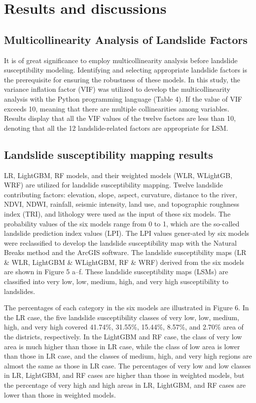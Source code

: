 \documentclass[a4paper,fleqn]{cas-sc}
\begin{document}
\section{Results and discussions}
\subsection{Multicollinearity Analysis of Landslide Factors}

It is of great significance to employ multicollinearity analysis before landslide susceptibility modeling. 
Identifying and selecting appropriate landslide factors is the prerequisite for ensuring the robustness of these models. 
In this study, the variance inflation factor (VIF) was utilized to develop the multicollinearity analysis with the Python programming language (Table 4). 
If the value of VIF exceeds 10, meaning that there are multiple collinearities among variables. 
Results display that all the VIF values of the twelve factors are less than 10, denoting that all the 12 landslide-related factors are appropriate for LSM.

\subsection{Landslide susceptibility mapping results}

LR, LightGBM, RF models, and their weighted models (WLR, WLightGB, WRF) are utilized for landslide susceptibility mapping. 
Twelve landslide contributing factors: elevation, slope, aspect, curvature, distance to the river, NDVI, NDWI, rainfall, seismic intensity, land use, and topographic roughness index (TRI), and lithology were used as the input of these six models. 
The probability values of the six models range from 0 to 1, which are the so-called landslide prediction index values (LPI). 
The LPI values gener-ated by six models were reclassified to develop the landslide susceptibility map with the Natural Breaks method and the ArcGIS software. 
The landslide susceptibility maps (LR \& WLR, LightGBM \& WLightGBM, RF \& WRF) derived from the six models are shown in Figure 5 a–f. 
These landslide susceptibility maps (LSMs) are classified into very low, low, medium, high, and very high susceptibility to landslides. 

The percentages of each category in the six models are illustrated in Figure 6. 
In the LR case, the five landslide susceptibility classes of very low, low, medium, high, and very high covered 41.74\%, 31.55\%, 15.44\%, 8.57\%, and 2.70\% area of the districts, respectively. 
In the LightGBM and RF case, the class of very low area is much higher than those in LR case, while the class of low area is lower than those in LR case, and the classes of medium, high, and very high regions are almost the same as those in LR case. 
The percentages of very low and low classes in LR, LightGBM, and RF cases are higher than those in weighted models, but the percentage of very high and high areas in LR, LightGBM, and RF cases are lower than those in weighted models.
\end{document}
